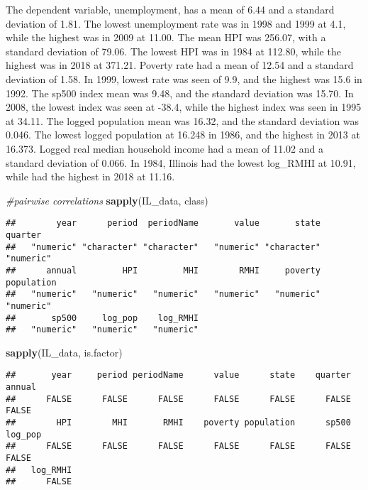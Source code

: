 \documentclass[
]{article}
\newenvironment{Shaded}{\begin{snugshade}}{\end{snugshade}}
\newcommand{\CommentTok}[1]{\textcolor[rgb]{0.56,0.35,0.01}{\textit{#1}}}
\newcommand{\KeywordTok}[1]{\textcolor[rgb]{0.13,0.29,0.53}{\textbf{#1}}}
\newcommand{\NormalTok}[1]{#1}
\begin{document}
The dependent variable, unemployment, has a mean of 6.44 and a standard
deviation of 1.81. The lowest unemployment rate was in 1998 and 1999 at
4.1, while the highest was in 2009 at 11.00. The mean HPI was 256.07,
with a standard deviation of 79.06. The lowest HPI was in 1984 at
112.80, while the highest was in 2018 at 371.21. Poverty rate had a mean
of 12.54 and a standard deviation of 1.58. In 1999, lowest rate was seen
of 9.9, and the highest was 15.6 in 1992. The sp500 index mean was 9.48,
and the standard deviation was 15.70. In 2008, the lowest index was seen
at -38.4, while the highest index was seen in 1995 at 34.11. The logged
population mean was 16.32, and the standard deviation was 0.046. The
lowest logged population at 16.248 in 1986, and the highest in 2013 at
16.373. Logged real median household income had a mean of 11.02 and a
standard deviation of 0.066. In 1984, Illinois had the lowest log\_RMHI
at 10.91, while had the highest in 2018 at 11.16.

\begin{Shaded}
\begin{Highlighting}[]
\CommentTok{#pairwise correlations}
\KeywordTok{sapply}\NormalTok{(IL_data, class)}
\end{Highlighting}
\end{Shaded}

\begin{verbatim}
##        year      period  periodName       value       state     quarter 
##   "numeric" "character" "character"   "numeric" "character"   "numeric" 
##      annual         HPI         MHI        RMHI     poverty  population 
##   "numeric"   "numeric"   "numeric"   "numeric"   "numeric"   "numeric" 
##       sp500     log_pop    log_RMHI 
##   "numeric"   "numeric"   "numeric"
\end{verbatim}

\begin{Shaded}
\begin{Highlighting}[]
\KeywordTok{sapply}\NormalTok{(IL_data, is.factor)}
\end{Highlighting}
\end{Shaded}

\begin{verbatim}
##       year     period periodName      value      state    quarter     annual 
##      FALSE      FALSE      FALSE      FALSE      FALSE      FALSE      FALSE 
##        HPI        MHI       RMHI    poverty population      sp500    log_pop 
##      FALSE      FALSE      FALSE      FALSE      FALSE      FALSE      FALSE 
##   log_RMHI 
##      FALSE
\end{verbatim}
\end{document}
